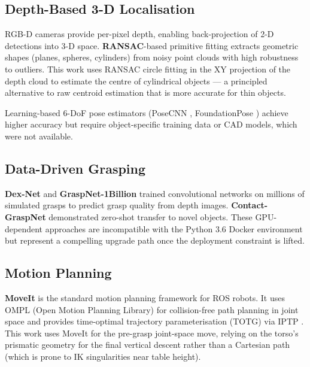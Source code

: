 \subsection{Depth-Based 3-D Localisation}

RGB-D cameras provide per-pixel depth, enabling back-projection of 2-D detections
into 3-D space.
\textbf{RANSAC}-based primitive fitting \cite{schnabel2007ransac} extracts geometric
shapes (planes, spheres, cylinders) from noisy point clouds with high robustness
to outliers.
This work uses RANSAC circle fitting in the XY projection of the depth cloud to
estimate the centre of cylindrical objects --- a principled alternative to raw
centroid estimation that is more accurate for thin objects.

Learning-based 6-DoF pose estimators (PoseCNN \cite{xiang2018posecnn},
FoundationPose \cite{wen2024foundationpose}) achieve higher accuracy but require
object-specific training data or CAD models, which were not available.

\subsection{Data-Driven Grasping}

\textbf{Dex-Net} \cite{mahler2017dexnet} and \textbf{GraspNet-1Billion}
\cite{fang2020graspnet} trained convolutional networks on millions of simulated
grasps to predict grasp quality from depth images.
\textbf{Contact-GraspNet} \cite{sundermeyer2021contact} demonstrated zero-shot
transfer to novel objects.
These GPU-dependent approaches are incompatible with the Python 3.6 Docker environment
but represent a compelling upgrade path once the deployment constraint is lifted.

\subsection{Motion Planning}

\textbf{MoveIt} \cite{sucan2013moveit} is the standard motion planning framework
for ROS robots.
It uses OMPL (Open Motion Planning Library) for collision-free path planning in joint
space and provides time-optimal trajectory parameterisation (TOTG) via IPTP
\cite{kunz2012totg}.
This work uses MoveIt for the pre-grasp joint-space move, relying on the torso's
prismatic geometry for the final vertical descent rather than a Cartesian path
(which is prone to IK singularities near table height).

